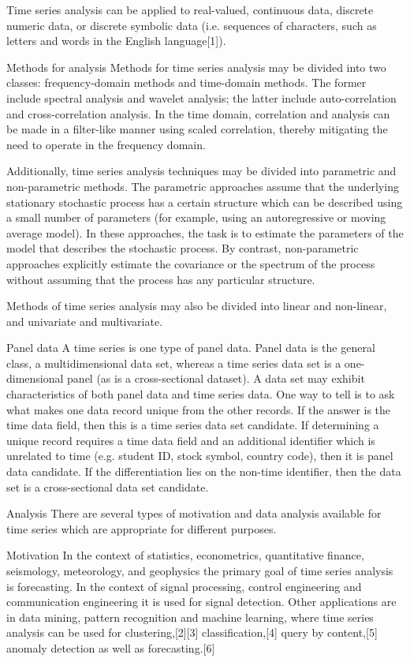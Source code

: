 Time series analysis can be applied to real-valued, continuous data, discrete numeric data, or discrete symbolic data (i.e. sequences of characters, such as letters and words in the English language[1]).

Methods for analysis
Methods for time series analysis may be divided into two classes: frequency-domain methods and time-domain methods. The former include spectral analysis and wavelet analysis; the latter include auto-correlation and cross-correlation analysis. In the time domain, correlation and analysis can be made in a filter-like manner using scaled correlation, thereby mitigating the need to operate in the frequency domain.

Additionally, time series analysis techniques may be divided into parametric and non-parametric methods. The parametric approaches assume that the underlying stationary stochastic process has a certain structure which can be described using a small number of parameters (for example, using an autoregressive or moving average model). In these approaches, the task is to estimate the parameters of the model that describes the stochastic process. By contrast, non-parametric approaches explicitly estimate the covariance or the spectrum of the process without assuming that the process has any particular structure.

Methods of time series analysis may also be divided into linear and non-linear, and univariate and multivariate.

Panel data
A time series is one type of panel data. Panel data is the general class, a multidimensional data set, whereas a time series data set is a one-dimensional panel (as is a cross-sectional dataset). A data set may exhibit characteristics of both panel data and time series data. One way to tell is to ask what makes one data record unique from the other records. If the answer is the time data field, then this is a time series data set candidate. If determining a unique record requires a time data field and an additional identifier which is unrelated to time (e.g. student ID, stock symbol, country code), then it is panel data candidate. If the differentiation lies on the non-time identifier, then the data set is a cross-sectional data set candidate.

Analysis
There are several types of motivation and data analysis available for time series which are appropriate for different purposes.

Motivation
In the context of statistics, econometrics, quantitative finance, seismology, meteorology, and geophysics the primary goal of time series analysis is forecasting. In the context of signal processing, control engineering and communication engineering it is used for signal detection. Other applications are in data mining, pattern recognition and machine learning, where time series analysis can be used for clustering,[2][3] classification,[4] query by content,[5] anomaly detection as well as forecasting.[6]

